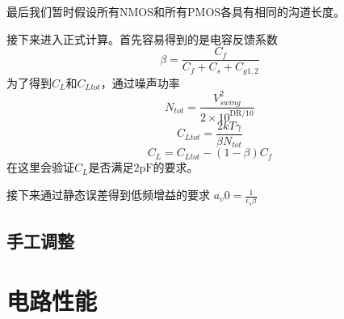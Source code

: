 \documentclass[a4paper]{article}
\newcommand{\upF}{\si{\pico\farad}}
\begin{document}
最后我们暂时假设所有NMOS和所有PMOS各具有相同的沟道长度。

接下来进入正式计算。首先容易得到的是电容反馈系数
$$\beta=\frac{C_f}{C_f+C_s+C_{g1,2}}$$
为了得到$C_L$和$C_{Ltot}$，通过噪声功率
$$N_{tot}=\frac{V_{swing}^2}{2\times10^{\mathrm{DR}/10}}$$
$$C_{Ltot}=\frac{2kT\gamma}{\beta N_{tot}}$$
$$C_L=C_{Ltot}-(1-\beta)C_f$$
在这里会验证$C_L$是否满足$2\upF$的要求。

接下来通过静态误差得到低频增益的要求
$a_v0=\frac{1}{\epsilon_s\beta}$




\subsection{手工调整}

\newpage

\section{电路性能}
\end{document}
